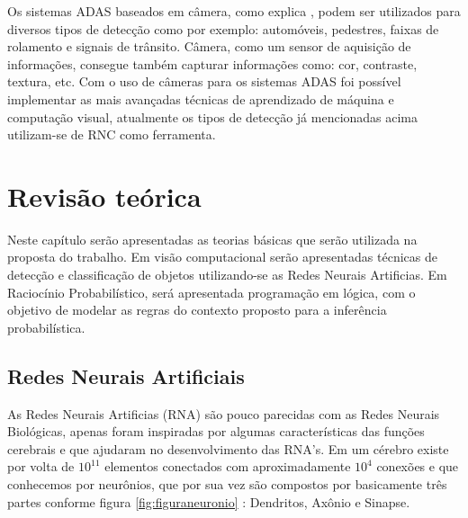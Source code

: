 \documentclass[
	12pt,				%
    oneside,			%
	a4paper,			%
	english,			%
	french,				%
	spanish,			%
	brazil,				%
	]{abntex2}
\begin{document}
Os sistemas ADAS baseados em câmera, como explica , podem ser utilizados para diversos tipos de detecção como por exemplo: automóveis, pedestres, faixas de rolamento e signais de trânsito. Câmera, como um sensor de aquisição de informações, consegue também capturar informações como: cor, contraste, textura, etc. Com o uso de câmeras para os sistemas ADAS foi possível implementar as mais avançadas técnicas de aprendizado de máquina e computação visual, atualmente os tipos de detecção já mencionadas acima utilizam-se de RNC como ferramenta.









\chapter{Revisão teórica}

Neste capítulo serão apresentadas as teorias básicas que serão utilizada na proposta do trabalho. Em visão computacional serão apresentadas técnicas de detecção e classificação de objetos utilizando-se as Redes Neurais Artificias. Em Raciocínio Probabilístico, será apresentada programação em lógica, com o objetivo de modelar as regras do contexto proposto para a inferência probabilística.

\section {Redes Neurais Artificiais}

As Redes Neurais Artificias (RNA) são pouco parecidas com as Redes Neurais Biológicas, apenas foram inspiradas por algumas características das funções cerebrais e que ajudaram no desenvolvimento das RNA's. Em um cérebro existe por volta de $10^{11}$ elementos conectados com aproximadamente $10^4$ conexões e que conhecemos por neurônios, que por sua vez são compostos por basicamente três partes conforme figura \ref{fig:figuraneuronio} : Dendritos, Axônio e Sinapse.
\end{document}
